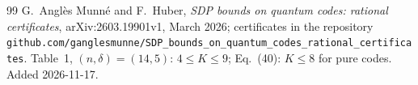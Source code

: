 \documentclass[11pt]{amsart}
\theoremstyle{plain}
\theoremstyle{definition}
\theoremstyle{remark}
\begin{document}
\begin{thebibliography}{99}
G.~Angl\`es Munn\'e and F.~Huber,
\emph{SDP bounds on quantum codes: rational certificates},
arXiv:2603.19901v1, March 2026; certificates in the repository
\texttt{github.com/ganglesmunne/SDP\_bounds\_on\_quantum\_codes\_rational\_certificates}.
Table~1, $(n,\delta)=(14,5)$: $4\le K\le 9$; Eq.~(40): $K\le 8$ for pure
codes. Added 2026-11-17.

\end{thebibliography}
\end{document}
